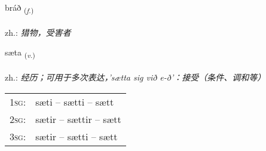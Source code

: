 \documentclass[frontgrid, backgrid]{flacards}\usepackage[]{graphicx}\usepackage[]{xcolor}
\begin{document}
\renewcommand{\flhead}{\vskip5pt \fboxsep=0pt {\small\bfseries\footnotesize Nafnorð | 名词}}
\renewcommand{\fcfoot}{\vskip5pt \fboxsep=0pt \hspace{2pt}{\small\bfseries\footnotesize 3K}}

\renewcommand{\blhead}{\vskip5pt {\small\bfseries\footnotesize Nafnorð | 名词 }}
\renewcommand{\bcfoot}{\vskip5pt \hspace{2pt}{\small\bfseries\footnotesize 3K}}


{bráð \small{\textsubscript{(\textit{f.})}} \\[1ex] %
\textphonetic{[prauːð]} \\
zh.: \emph{猎物，受害者} \\  [2ex]
\renewcommand*{\arraystretch}{0.8}
}

\renewcommand{\flhead}{\vskip5pt \fboxsep=0pt {\small\bfseries\footnotesize Sagnorð | 动词}}
\renewcommand{\fcfoot}{\vskip5pt \fboxsep=0pt \hspace{2pt}{\small\bfseries\footnotesize 3K}}

\renewcommand{\blhead}{\vskip5pt {\small\bfseries\footnotesize Sagnorð | 动词 }}
\renewcommand{\bcfoot}{\vskip5pt \hspace{2pt}{\small\bfseries\footnotesize 3K}}


{sæta \small{\textsubscript{(\textit{v.})}} \\[1ex] %
\textphonetic{[saiːta]} \\
zh.: \emph{经历；可用于多次表达，'sætta sig við e-ð'：接受（条件、调和等）} \\  [2ex]
\renewcommand*{\arraystretch}{0.8}
\begin{tabular}{p{1cm}l}
\textsc{1sg}: & sæti -- sætti -- sætt \\ 
\textsc{2sg}: & sætir -- sættir -- sætt \\ 
\textsc{3sg}: & sætir -- sætti -- sætt \\ 
\end{tabular}
}
\end{document}
